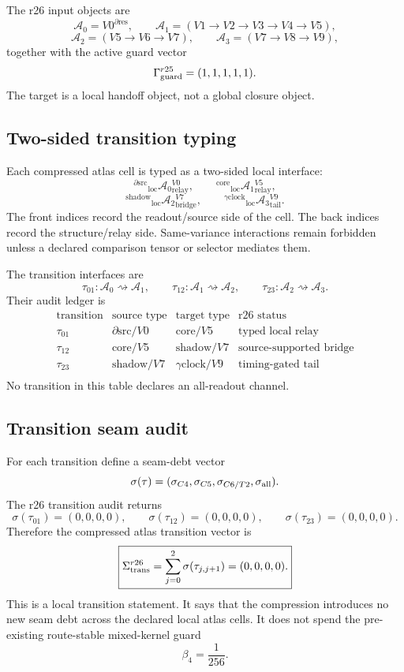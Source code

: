 The r26 input objects are
\[
\mathcal A_0=V0^{\partial\mathrm{res}},
\qquad
\mathcal A_1=(V1\to V2\to V3\to V4\to V5),
\]
\[
\mathcal A_2=(V5\to V6\to V7),
\qquad
\mathcal A_3=(V7\to V8\to V9),
\]
together with the active guard vector
\[
\Gamma_{\rm guard}^{r25}=(1,1,1,1,1).
\]
The target is a local handoff object, not a global closure object.

\subsection{Two-sided transition typing}
\label{subsec:v470-r26-two-sided-transition-typing}

Each compressed atlas cell is typed as a two-sided local interface:
\[
{}^{\partial\mathrm{src}}{}_{\mathrm{loc}}\mathcal A_0{}^{V0}_{\mathrm{relay}},
\qquad
{}^{\mathrm{core}}{}_{\mathrm{loc}}\mathcal A_1{}^{V5}_{\mathrm{relay}},
\]
\[
{}^{\mathrm{shadow}}{}_{\mathrm{loc}}\mathcal A_2{}^{V7}_{\mathrm{bridge}},
\qquad
{}^{\gamma\mathrm{clock}}{}_{\mathrm{loc}}\mathcal A_3{}^{V9}_{\mathrm{tail}}.
\]
The front indices record the readout/source side of the cell.  The back indices
record the structure/relay side.  Same-variance interactions remain forbidden
unless a declared comparison tensor or selector mediates them.

The transition interfaces are
\[
\tau_{01}:\mathcal A_0\rightsquigarrow\mathcal A_1,
\qquad
\tau_{12}:\mathcal A_1\rightsquigarrow\mathcal A_2,
\qquad
\tau_{23}:\mathcal A_2\rightsquigarrow\mathcal A_3.
\]
Their audit ledger is
\[
\boxed{
\begin{array}{c|c|c|c}
\text{transition} & \text{source type} & \text{target type} & \text{r26 status}\\
\hline
\tau_{01} & \partial\mathrm{src}/V0 & \mathrm{core}/V5 & \text{typed local relay}\\
\tau_{12} & \mathrm{core}/V5 & \mathrm{shadow}/V7 & \text{source-supported bridge}\\
\tau_{23} & \mathrm{shadow}/V7 & \gamma\mathrm{clock}/V9 & \text{timing-gated tail}\\
\end{array}
}
\]
No transition in this table declares an all-readout channel.

\subsection{Transition seam audit}
\label{subsec:v470-r26-transition-seam-audit}

For each transition define a seam-debt vector
\[
\sigma(\tau)
=
(\sigma_{C4},\sigma_{C5},\sigma_{C6/T2},\sigma_{\rm all}).
\]
The r26 transition audit returns
\[
\boxed{
\sigma(\tau_{01})=(0,0,0,0),
\qquad
\sigma(\tau_{12})=(0,0,0,0),
\qquad
\sigma(\tau_{23})=(0,0,0,0).
}
\]
Therefore the compressed atlas transition vector is
\[
\boxed{
\Sigma_{\rm trans}^{r26}
=
\sum_{j=0}^{2}\sigma(\tau_{j,j+1})
=(0,0,0,0).
}
\]
This is a local transition statement.  It says that the compression introduces
no new seam debt across the declared local atlas cells.  It does not spend the
pre-existing route-stable mixed-kernel guard
\[
\beta_4=\frac1{256}.
\]

